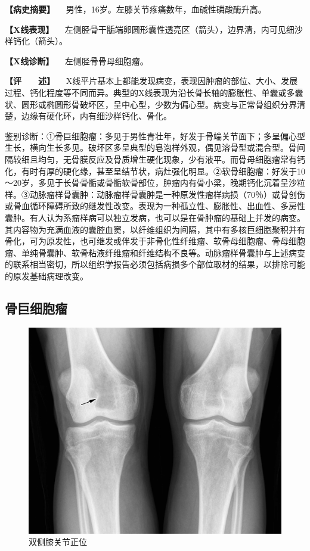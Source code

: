 \textbf{【病史摘要】} 　男性，16岁。左膝关节疼痛数年，血碱性磷酸酶升高。

\textbf{【X线表现】}
　左侧胫骨干骺端卵圆形囊性透亮区（箭头），边界清，内可见细沙样钙化（箭头）。

\textbf{【X线诊断】} 　左侧胫骨骨母细胞瘤。

\textbf{【评　　述】}
　X线平片基本上都能发现病变，表现因肿瘤的部位、大小、发展过程、钙化程度等不同而异。典型的X线表现为沿长骨长轴的膨胀性、单囊或多囊状、圆形或椭圆形骨破坏区，呈中心型，少数为偏心型。病变与正常骨组织分界清楚，边缘有硬化环，内有细沙样钙化、骨化。

鉴别诊断：①骨巨细胞瘤：多见于男性青壮年，好发于骨端关节面下；多呈偏心型生长，横向生长多见。破坏区多呈典型的皂泡样外观，偶见溶骨型或混合型。骨间隔较细且均匀，无骨膜反应及骨质增生硬化现象，少有液平。而骨母细胞瘤常有钙化，有时有厚的硬化缘，甚至呈结节状，病灶强化明显。②软骨细胞瘤：好发于10～20岁，多见于长骨骨骺或骨骺软骨部位，肿瘤内有骨小梁，晚期钙化沉着呈沙粒样。③动脉瘤样骨囊肿：动脉瘤样骨囊肿是一种原发性瘤样病损（70％）或骨创伤或骨血循环障碍所致的继发性改变。表现为一种孤立性、膨胀性、出血性、多房性囊肿。有人认为系瘤样病可以独立发病，也可以是在骨肿瘤的基础上并发的病变。其内容物为充满血液的囊腔血窦，以纤维组织为间隔，其中有多核巨细胞聚积并有骨化，可为原发性，也可继发或伴发于非骨化性纤维瘤、软骨母细胞瘤、骨母细胞瘤、单纯骨囊肿、软骨粘液纤维瘤和纤维结构不良等。动脉瘤样骨囊肿与上述病变的联系相当密切，所以组织学报告必须包括病损多个部位取材的结果，以排除可能的原发基础病理改变。

\subsection{骨巨细胞瘤}

\begin{figure}[!htbp]
 \centering
 \includegraphics{./images/Image00095.jpg}
 \captionsetup{justification=centering}
 \caption{双侧膝关节正位}
 \label{fig2-7-10}
  \end{figure} 

